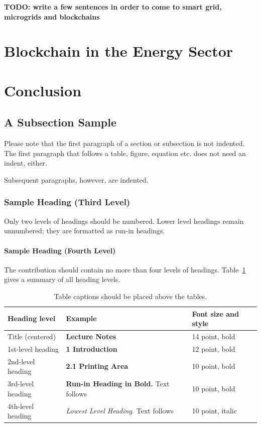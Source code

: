 \documentclass[runningheads]{llncs}
\begin{document}
\textbf{TODO: write a few sentences in order to come to smart grid, microgrids and blockchains}


\section{Blockchain in the Energy Sector}

\section{Conclusion}

\subsection{A Subsection Sample}
Please note that the first paragraph of a section or subsection is
not indented. The first paragraph that follows a table, figure,
equation etc. does not need an indent, either.

Subsequent paragraphs, however, are indented.

\subsubsection{Sample Heading (Third Level)} Only two levels of
headings should be numbered. Lower level headings remain unnumbered;
they are formatted as run-in headings.

\paragraph{Sample Heading (Fourth Level)}
The contribution should contain no more than four levels of
headings. Table~\ref{tab1} gives a summary of all heading levels.

\begin{table}
\caption{Table captions should be placed above the
tables.}\label{tab1}
\begin{tabular}{|l|l|l|}
\hline
Heading level &  Example & Font size and style\\
\hline
Title (centered) &  {\Large\bfseries Lecture Notes} & 14 point, bold\\
1st-level heading &  {\large\bfseries 1 Introduction} & 12 point, bold\\
2nd-level heading & {\bfseries 2.1 Printing Area} & 10 point, bold\\
3rd-level heading & {\bfseries Run-in Heading in Bold.} Text follows & 10 point, bold\\
4th-level heading & {\itshape Lowest Level Heading.} Text follows & 10 point, italic\\
\hline
\end{tabular}
\end{table}
\end{document}
